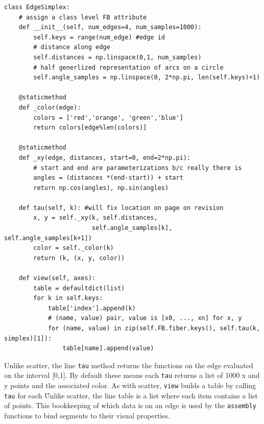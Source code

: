 \documentclass[../main.tex]{subfiles}
\begin{document}
\begin{verbatim}
class EdgeSimplex: 
    # assign a class level FB attribute
    def __init__(self, num_edges=4, num_samples=1000): 
        self.keys = range(num_edge) #edge id
        # distance along edge
        self.distances = np.linspace(0,1, num_samples)
        # half generlized representation of arcs on a circle
        self.angle_samples = np.linspace(0, 2*np.pi, len(self.keys)+1)

    @staticmethod
    def _color(edge):
        colors = ['red','orange', 'green','blue']
        return colors[edge%len(colors)]

    @staticmethod
    def _xy(edge, distances, start=0, end=2*np.pi):
        # start and end are parameterizations b/c really there is 
        angles = (distances *(end-start)) + start
        return np.cos(angles), np.sin(angles)

    def tau(self, k): #will fix location on page on revision
        x, y = self._xy(k, self.distances, 
                        self.angle_samples[k], self.angle_samples[k+1]) 
        color = self._color(k) 
        return (k, (x, y, color))

    def view(self, axes):
        table = defaultdict(list)
        for k in self.keys:
            table['index'].append(k)
            # (name, value) pair, value is [x0, ..., xn] for x, y
            for (name, value) in zip(self.FB.fiber.keys(), self.tau(k, simplex)[1]):
                table[name].append(value)
\end{verbatim}
Unlike scatter, the line \texttt{tau} method returns the functions on the edge evaluated on the interval [0,1]. By default these means each \texttt{tau} returns a list of 1000 x and y points and the associated color. As with scatter, \texttt{view} builds a table by calling \texttt{tau} for each \dbasepoint\. Unlike scatter, the line table is a list where each item contains a list of points. This bookkeeping of which data is on an edge is used by the \texttt{assembly} functions to bind segments to their visual properties. 
\end{document}
